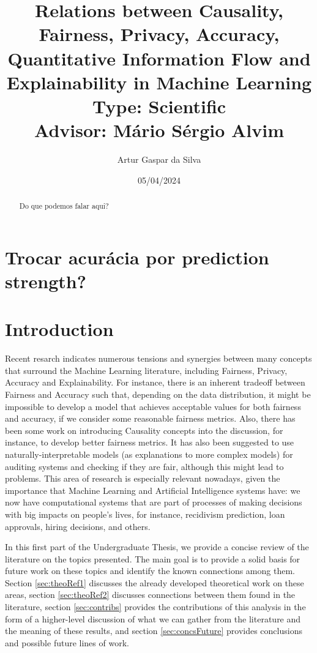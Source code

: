 \documentclass{article}
\title{Relations between Causality, Fairness, Privacy, Accuracy, Quantitative Information Flow and Explainability in Machine Learning\large\\ Type: Scientific\\Advisor: Mário Sérgio Alvim}
\author{Artur Gaspar da Silva}
\date{05/04/2024}
\begin{document}
\maketitle

\begin{abstract}
    Do que podemos falar aqui?
\end{abstract}

\section{Trocar acurácia por prediction strength?}

\section{Introduction}

Recent resarch\cite{Sok}\cite{Reductions}\cite{Rachel}\cite{Awareness} indicates numerous tensions and synergies between many concepts that surround the Machine Learning literature, including Fairness, Privacy, Accuracy and Explainability. For instance, there is an inherent tradeoff between Fairness and Accuracy such that, depending on the data distribution, it might be impossible to develop a model that achieves acceptable values for both fairness and accuracy, if we consider some reasonable fairness metrics\cite{Carlos}. Also, there has been some work on introducing Causality concepts into the discussion, for instance, to develop better fairness metrics\cite{CausalFair}. It has also been suggested to use naturally-interpretable models (as explanations to more complex models) for auditing systems and checking if they are fair, although this might lead to problems\cite{ExplainAll}. This area of research is especially relevant nowadays, given the importance that Machine Learning and Artificial Intelligence systems have: we now have computational systems that are part of processes of making decisions with big impacts on people's lives, for instance, recidivism prediction\cite{Compass}, loan approvals\cite{Loans}, hiring decisions\cite{Jobs}, and others.

In this first part of the Undergraduate Thesis, we provide a concise review of the literature on the topics presented. The main goal is to provide a solid basis for future work on these topics and identify the known connections among them. Section \ref{sec:theoRef1} discusses the already developed theoretical work on these areas, section \ref{sec:theoRef2} discusses connections between them found in the literature, section \ref{sec:contribs} provides the contributions of this analysis in the form of a higher-level discussion of what we can gather from the literature and the meaning of these results, and section \ref{sec:concsFuture} provides conclusions and possible future lines of work. 
\end{document}
